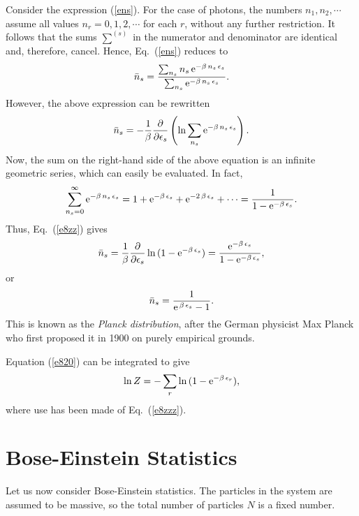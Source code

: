 Consider the expression (\ref{ens}). For the case of photons, the
numbers $n_1, n_2,\cdots$ assume all values $n_r=0,1,2,\cdots$ for each $r$,
without any further restriction. It follows that the sums $\sum^{(s)}$ in the
numerator and denominator are identical and, therefore, cancel. Hence,
Eq.~(\ref{ens}) reduces to
\begin{equation}
\bar{n}_s = \frac{\sum_{n_s} n_s\,{\rm e}^{-\beta\,n_s\,\epsilon_s}}
{\sum_{n_s} {\rm e}^{-\beta\,n_s\,\epsilon_s}}.\label{e8sum}
\end{equation}
However, the above expression can be rewritten
\begin{equation}
\bar{n}_s =-\frac{1}{\beta}\frac{\partial}{\partial \epsilon_s}\left(\ln\sum_{n_s}
{\rm e}^{-\beta\,n_s\,\epsilon_s}\right).\label{e8zz}
\end{equation}
Now, the sum on the right-hand side of the above equation is an infinite
geometric series, which can easily be evaluated. In fact,
\begin{equation}
\sum_{n_s=0}^\infty {\rm e}^{-\beta\,n_s\,\epsilon_s} 
= 1 + {\rm e}^{-\beta\,\epsilon_s} + {\rm e}^{-2\,\beta\,\epsilon_s} +
\cdots = \frac{1}{1-{\rm e}^{-\beta\,\epsilon_s}}.
\end{equation}
Thus, Eq.~(\ref{e8zz}) gives
\begin{equation}
\bar{n}_s =\frac{1}{\beta} \frac{\partial}{\partial\epsilon_s}
\ln\,(1-{\rm e}^{-\beta\,\epsilon_s}) =\frac{{\rm e}^{-\beta\,\epsilon_s}}
{1-{\rm e}^{-\beta\,\epsilon_s}},
\end{equation}
or
\begin{equation}\label{e8zzz}
\bar{n}_s = \frac{1}{{\rm e}^{\,\beta\,\epsilon_s}-1}.
\end{equation}
This is known as the {\em Planck distribution}, after the German physicist
Max Planck who first proposed it in 1900 on purely empirical grounds.

Equation (\ref{e820}) can be integrated to
give
\begin{equation}
\ln Z = -\sum_r \ln\,(1-{\rm e}^{-\beta\,\epsilon_r}),
\end{equation}
where use has been made of Eq.~(\ref{e8zzz}).

\section{Bose-Einstein Statistics}
Let us now consider Bose-Einstein statistics. The particles in the
system are assumed to be massive, so  the total number of
particles $N$ is a fixed number. 

